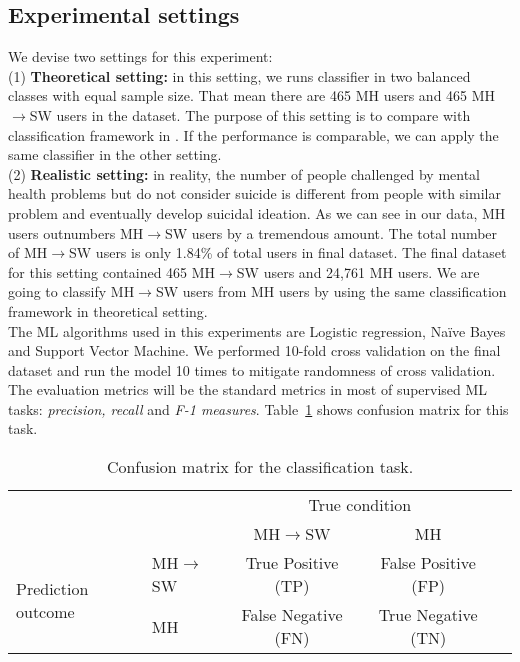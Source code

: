 \subsection{Experimental settings}
We devise two settings for this experiment:\\
(1) \textbf{Theoretical setting:} in this setting, we runs classifier in two balanced classes with equal sample size. That mean there are 465 MH users and 465 MH$\rightarrow$SW users in the dataset. The purpose of this setting is to compare with classification framework in \cite{DeChoudhury2016}. If the performance is comparable, we can apply the same classifier in the other setting.\\
(2) \textbf{Realistic setting:} in reality, the number of people challenged by mental health problems but do not consider suicide is different from people with similar problem and eventually develop suicidal ideation. As we can see in our data, MH users outnumbers MH$\rightarrow$SW users by a tremendous amount. The total number of MH$\rightarrow$SW users is only 1.84\% of total users in final dataset. The final dataset for this setting contained 465 MH$\rightarrow$SW users and 24,761 MH users. We are going to classify MH$\rightarrow$SW users from MH users by using the same classification framework in theoretical setting.\\
The ML algorithms used in this experiments are Logistic regression, Na\"ive Bayes and Support Vector Machine. We performed 10-fold cross validation on the final dataset and run the model 10 times to mitigate randomness of cross validation. The evaluation metrics will be the standard metrics in most of supervised ML tasks: \textit{precision, recall} and \textit{F-1 measures}. Table~\ref{tab:confusion_matrix} shows confusion matrix for this task.\\
\begin{table}
\begin{tabular}{l|l|c|c|c}
\multicolumn{2}{c}{}&\multicolumn{2}{c}{True condition}&\\
\cline{3-4}
\multicolumn{2}{c|}{} & MH$\rightarrow$SW &  MH \\
\cline{2-4}
\multirow{2}{*}{Prediction outcome} & MH$\rightarrow$SW & True Positive (TP) &  False Positive (FP) \\
\cline{2-4}
& MH & False Negative (FN) & True Negative (TN) \\
\cline{2-4}
\end{tabular}
\caption{Confusion matrix for the classification task.}
\label{tab:confusion_matrix}
\end{table}
